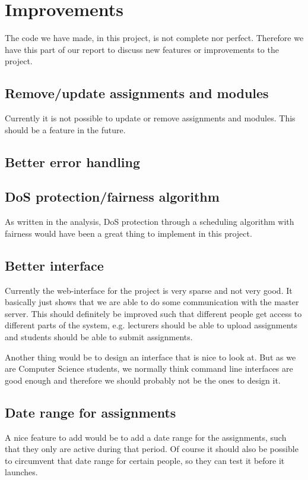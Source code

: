 \section{Improvements}
The code we have made, in this project, is not complete nor perfect. Therefore
we have this part of our report to discuss new features or improvements to the
project.

\subsection{Remove/update assignments and modules}
Currently it is not possible to update or remove assignments and modules. This
should be a feature in the future.

\subsection{Better error handling}

\subsection{DoS protection/fairness algorithm}
As written in the analysis, DoS protection through a scheduling algorithm with
fairness would have been a great thing to implement in this project.

\subsection{Better interface}
Currently the web-interface for the project is very sparse and not very good.
It basically just shows that we are able to do some communication with the
master server. This should definitely be improved such that different people get
access to different parts of the system, e.g. lecturers should be able to upload
assignments and students should be able to submit assignments.

Another thing would be to design an interface that is nice to look at. But as we
are Computer Science students, we normally think command line interfaces are
good enough and therefore we should probably not be the ones to design it.

\subsection{Date range for assignments}
A nice feature to add would be to add a date range for the assignments, such
that they only are active during that period. Of course it should also be
possible to circumvent that date range for certain people, so they can test it
before it launches.

